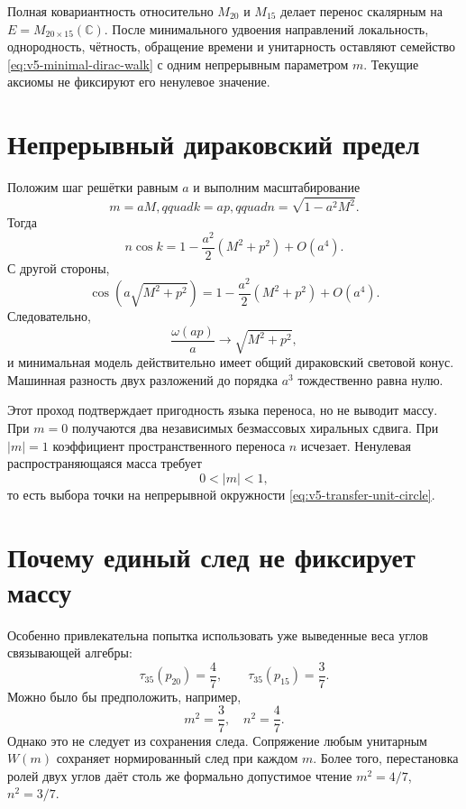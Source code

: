 \begin{theorem}
Полная ковариантность относительно $M_{20}$ и $M_{15}$ делает перенос
скалярным на $E=M_{20\times15}(\mathbb C)$. После минимального удвоения
направлений локальность, однородность, чётность, обращение времени и
унитарность оставляют семейство \eqref{eq:v5-minimal-dirac-walk} с одним
непрерывным параметром $m$. Текущие аксиомы не фиксируют его ненулевое
значение.
\end{theorem}

\section{Непрерывный дираковский предел}

Положим шаг решётки равным $a$ и выполним масштабирование
\begin{equation}
 m=aM,qquad k=ap,qquad n=\sqrt{1-a^2M^2}.
\end{equation}
Тогда
\begin{equation}
 n\cos k
 =1-\frac{a^2}{2}(M^2+p^2)+O(a^4).
\end{equation}
С другой стороны,
\begin{equation}
 \cos\!\left(a\sqrt{M^2+p^2}\right)
 =1-\frac{a^2}{2}(M^2+p^2)+O(a^4).
\end{equation}
Следовательно,
\begin{equation}
 \frac{\omega(ap)}a\longrightarrow\sqrt{M^2+p^2},
 \label{eq:v5-transfer-dirac-limit}
\end{equation}
и минимальная модель действительно имеет общий дираковский световой конус.
Машинная разность двух разложений до порядка $a^3$ тождественно равна
нулю.

Этот проход подтверждает пригодность языка переноса, но не выводит массу.
При $m=0$ получаются два независимых безмассовых хиральных сдвига. При
$|m|=1$ коэффициент пространственного переноса $n$ исчезает. Ненулевая
распространяющаяся масса требует
\begin{equation}
 0<|m|<1,
\end{equation}
то есть выбора точки на непрерывной окружности
\eqref{eq:v5-transfer-unit-circle}.

\section{Почему единый след не фиксирует массу}

Особенно привлекательна попытка использовать уже выведенные веса углов
связывающей алгебры:
\begin{equation}
 \tau_{35}(p_{20})=\frac47,
 \qquad
 \tau_{35}(p_{15})=\frac37.
 \label{eq:v5-transfer-corner-weights}
\end{equation}
Можно было бы предположить, например,
\begin{equation}
 m^2=\frac37,\quad n^2=\frac47.
 \label{eq:v5-tempting-weight-mass}
\end{equation}
Однако это не следует из сохранения следа. Сопряжение любым унитарным
$W(m)$ сохраняет нормированный след при каждом $m$. Более того, перестановка
ролей двух углов даёт столь же формально допустимое чтение
$m^2=4/7$, $n^2=3/7$.

